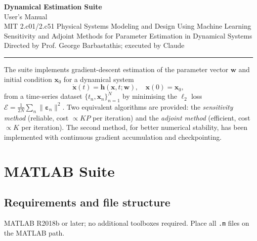 \documentclass[10pt]{article}
\begin{document}
	
	\begin{center}
		{\LARGE\bfseries Dynamical Estimation Suite}\\[4pt]
		{\large User's Manual}\\[6pt]
		{\normalsize MIT 2.c01/2.c51 Physical Systems Modeling and Design Using Machine Learning}\\[4pt]
		{\normalsize Sensitivity and Adjoint Methods for Parameter Estimation
			in Dynamical Systems}\\[4pt]
		{\small Directed by Prof. George Barbastathis; executed by Claude}
	\end{center}
	
	\vspace{-2pt}
	\noindent\rule{\linewidth}{0.8pt}
	\vspace{4pt}
	
	The suite implements gradient-descent estimation of the parameter vector
	$\mathbf{w}$ and initial condition $\mathbf{x}_0$ for a dynamical system
	\[
	\dot{\mathbf{x}}(t) = \mathbf{h}(\mathbf{x},t;\mathbf{w}),
	\quad \mathbf{x}(0)=\mathbf{x}_0,
	\]
	from a time-series dataset $\{t_n, \mathbf{x}_n\}_{n=1}^N$ by minimising the
	$\ell_2$ loss $\mathcal{E}=\frac{1}{2N}\sum_n\|\boldsymbol{\varepsilon}_n\|^2$.
	Two equivalent algorithms are provided: the \textit{sensitivity method}
	(reliable, cost $\propto KP$ per iteration) and the \textit{adjoint method}
	(efficient, cost $\propto K$ per iteration). The second method, for better numerical stability, has been implemented with continuous gradient
	accumulation and checkpointing.
	
	\section{MATLAB Suite}
	
	\subsection{Requirements and file structure}
	
	MATLAB R2018b or later; no additional toolboxes required.
	Place all \texttt{.m} files on the MATLAB path.
	
\end{document}
